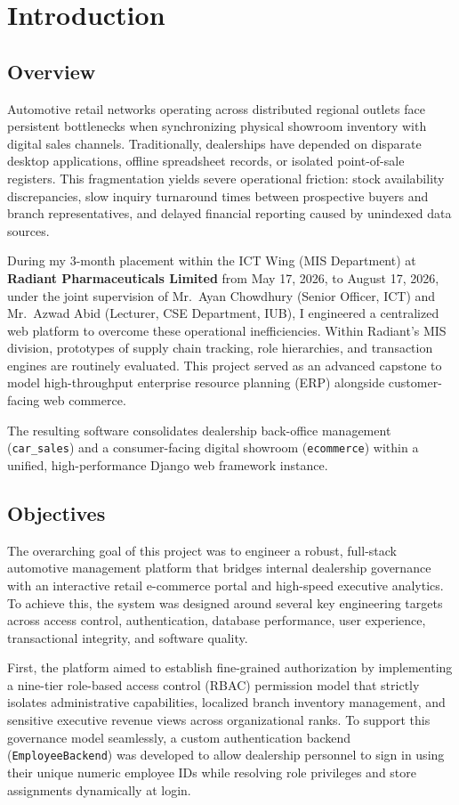 \chapter{Introduction}

\section{Overview}
Automotive retail networks operating across distributed regional outlets face persistent bottlenecks when synchronizing physical showroom inventory with digital sales channels. Traditionally, dealerships have depended on disparate desktop applications, offline spreadsheet records, or isolated point-of-sale registers. This fragmentation yields severe operational friction: stock availability discrepancies, slow inquiry turnaround times between prospective buyers and branch representatives, and delayed financial reporting caused by unindexed data sources.

During my 3-month placement within the ICT Wing (MIS Department) at \textbf{Radiant Pharmaceuticals Limited} from May 17, 2026, to August 17, 2026, under the joint supervision of Mr.~Ayan Chowdhury (Senior Officer, ICT) and Mr.~Azwad Abid (Lecturer, CSE Department, IUB), I engineered a centralized web platform to overcome these operational inefficiencies. Within Radiant's MIS division, prototypes of supply chain tracking, role hierarchies, and transaction engines are routinely evaluated. This project served as an advanced capstone to model high-throughput enterprise resource planning (ERP) alongside customer-facing web commerce.

The resulting software consolidates dealership back-office management (\texttt{car\_sales}) and a consumer-facing digital showroom (\texttt{ecommerce}) within a unified, high-performance Django web framework instance.

\section{Objectives}
The overarching goal of this project was to engineer a robust, full-stack automotive management platform that bridges internal dealership governance with an interactive retail e-commerce portal and high-speed executive analytics. To achieve this, the system was designed around several key engineering targets across access control, authentication, database performance, user experience, transactional integrity, and software quality.

First, the platform aimed to establish fine-grained authorization by implementing a nine-tier role-based access control (RBAC) permission model that strictly isolates administrative capabilities, localized branch inventory management, and sensitive executive revenue views across organizational ranks. To support this governance model seamlessly, a custom authentication backend (\texttt{EmployeeBackend}) was developed to allow dealership personnel to sign in using their unique numeric employee IDs while resolving role privileges and store assignments dynamically at login.

